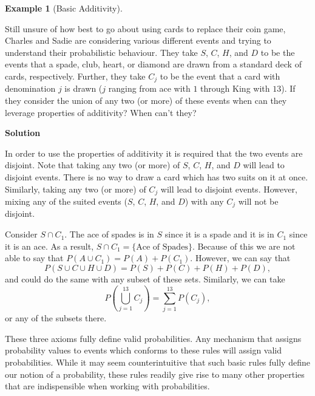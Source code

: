 \documentclass[
  letterpaper,
  DIV=11,
  numbers=noendperiod]{scrreprt}
\theoremstyle{definition}
\theoremstyle{definition}
\newtheorem{example}{Example}[chapter]
\theoremstyle{definition}
\theoremstyle{remark}
\begin{document}
\begin{example}[Basic
Additivity]\protect\hypertarget{exm-additivity}{}\label{exm-additivity}

Still unsure of how best to go about using cards to replace their coin
game, Charles and Sadie are considering various different events and
trying to understand their probabilistic behaviour. They take \(S\),
\(C\), \(H\), and \(D\) to be the events that a spade, club, heart, or
diamond are drawn from a standard deck of cards, respectively. Further,
they take \(C_j\) to be the event that a card with denomination \(j\) is
drawn (\(j\) ranging from ace with \(1\) through King with \(13\)). If
they consider the union of any two (or more) of these events when can
they leverage properties of additivity? When can't they?

\begin{tcolorbox}[enhanced jigsaw, colback=white, colframe=quarto-callout-color-frame, arc=.35mm, leftrule=.75mm, rightrule=.15mm, opacityback=0, breakable, bottomrule=.15mm, left=2mm, toprule=.15mm]

\vspace{-3mm}\textbf{Solution}\vspace{3mm}

In order to use the properties of additivity it is required that the two
events are disjoint. Note that taking any two (or more) of \(S\), \(C\),
\(H\), and \(D\) will lead to disjoint events. There is no way to draw a
card which has two suits on it at once. Similarly, taking any two (or
more) of \(C_j\) will lead to disjoint events. However, mixing any of
the suited events (\(S\), \(C\), \(H\), and \(D\)) with any \(C_j\) will
not be disjoint.

Consider \(S\cap C_1\). The ace of spades is in \(S\) since it is a
spade and it is in \(C_1\) since it is an ace. As a result,
\(S\cap C_1 = \{\text{Ace of Spades}\}\). Because of this we are not
able to say that \(P(A \cup C_1) = P(A) + P(C_1)\). However, we can say
that \[P(S\cup C\cup H\cup D) = P(S) + P(C) + P(H) + P(D),\] and could
do the same with any subset of these sets. Similarly, we can take
\[P\left(\bigcup_{j=1}^{13} C_j\right) = \sum_{j=1}^{13} P(C_j),\] or
any of the subsets there.

\end{tcolorbox}

\end{example}

These three axioms fully define valid probabilities. Any mechanism that
assigns probability values to events which conforms to these rules will
assign valid probabilities. While it may seem counterintuitive that such
basic rules fully define our notion of a probability, these rules
readily give rise to many other properties that are indispensible when
working with probabilities.
\end{document}

